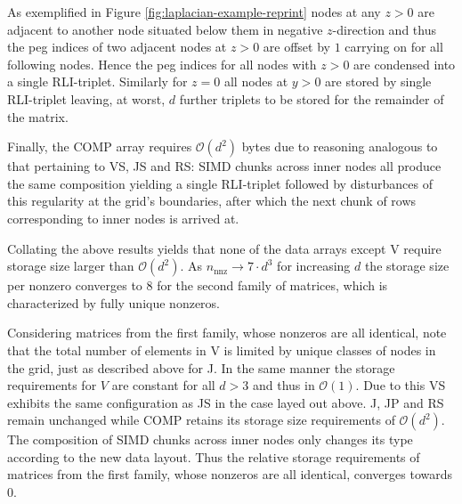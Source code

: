     As exemplified in Figure \ref{fig:laplacian-example-reprint} nodes at any $z > 0$ are adjacent to another node
    situated below them in negative $z$-direction and thus the peg indices of two adjacent nodes at $z > 0$ are offset
    by $1$ carrying on for all following nodes. Hence the peg indices for all nodes with $z > 0$ are condensed into a
    single RLI-triplet. Similarly for $z = 0$ all nodes at $y > 0$ are stored by single RLI-triplet leaving, at worst,
    $d$ further triplets to be stored for the remainder of the matrix.
 
    Finally, the COMP array requires $\mathcal{O}(d^2)$ bytes due to reasoning analogous to that pertaining to VS, JS
    and RS: SIMD chunks across inner nodes all produce the same composition yielding a single RLI-triplet followed by
    disturbances of this regularity at the grid's boundaries, after which the next chunk of rows corresponding to inner
    nodes is arrived at.

    Collating the above results yields that none of the data arrays except V require storage size larger than
    $\mathcal{O}(d^2)$. As $n_{\text{nnz}} \rightarrow 7\cdot d^3$ for increasing $d$ the storage size per nonzero
    converges to 8 for the second family of matrices, which is characterized by fully unique nonzeros.

    \begin{center}
    \end{center}

    Considering matrices from the first family, whose nonzeros are all identical, note that the total number of elements
    in V is limited by unique classes of nodes in the grid, just as described above for J. In the same manner the
    storage requirements for $V$ are constant for all $d > 3$ and thus in $\mathcal{O}(1)$. Due to this VS exhibits the
    same configuration as JS in the case layed out above. J, JP and RS remain unchanged while COMP retains its storage
    size requirements of $\mathcal{O}(d^2)$. The composition of SIMD chunks across inner nodes only changes its type
    according to the new data layout. Thus the relative storage requirements of matrices from the first family, whose
    nonzeros are all identical, converges towards $0$.

